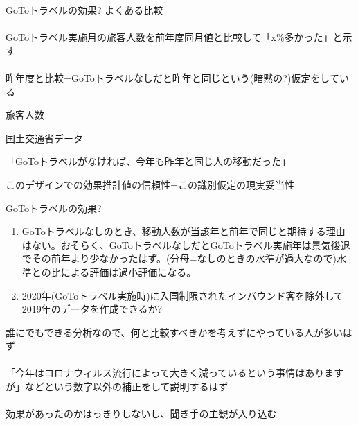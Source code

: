 \begin{frame}[t]{GoToトラベルの効果?}
よくある比較\\~\\
\pause
GoToトラベル実施月の旅客人数を前年度同月値と比較して「x\%多かった」と示す\\~\\
\pause
昨年度と比較=GoToトラベルなしだと昨年と同じという(暗黙の?)仮定をしている
\begin{description}
\vspace{1.0ex}\setlength{\itemsep}{1.0ex}\setlength{\baselineskip}{12pt}
\pause
\item[被説明変数]	旅客人数
\pause
\item[データ]	国土交通省データ
\pause
\item[識別仮定identification assumption]	「GoToトラベルがなければ、今年も昨年と同じ人の移動だった」
	\begin{dinglist}{43}
	\vspace{1.0ex}\setlength{\itemsep}{1.0ex}\setlength{\baselineskip}{12pt}
\pause
	\item	このデザインでの効果推計値の信頼性=この識別仮定の現実妥当性
	\end{dinglist}
\end{description}
\end{frame}

\begin{frame}[t]{GoToトラベルの効果?}
\begin{description}
\vspace{1.0ex}\setlength{\itemsep}{1.0ex}\setlength{\baselineskip}{12pt}
\item[課題] 
	\begin{enumerate}
	\vspace{1.0ex}\setlength{\itemsep}{1.0ex}\setlength{\baselineskip}{12pt}
\pause
	\item	GoToトラベルなしのとき、移動人数が当該年と前年で同じと期待する理由はない。おそらく、GoToトラベルなしだとGoToトラベル実施年は景気後退でその前年より少なかったはず。(分母=なしのときの水準が過大なので)水準との比による評価は過小評価になる。
\pause
	\item	2020年(GoToトラベル実施時)に入国制限されたインバウンド客を除外して2019年のデータを作成できるか? 
	\end{enumerate}
\end{description}

\pause
\vspace{2ex}
誰にでもできる分析なので、何と比較すべきかを考えずにやっている人が多いはず\\~\\
\pause
「今年はコロナウィルス流行によって大きく減っているという事情はありますが」などという数字以外の補正をして説明するはず\\~\\
\pause
効果があったのかはっきりしないし、聞き手の主観が入り込む
\end{frame}


